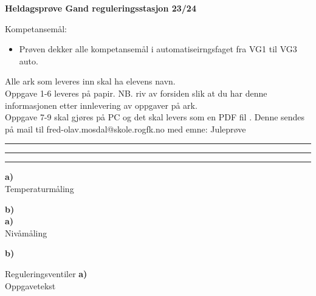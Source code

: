 
\huge
\centerline{\bf Heldagsprøve Gand reguleringsstasjon 23/24}  \bigskip
\normalsize


\vskip 3cm 
Kompetansemål:
\begin{itemize}[noitemsep]

	\item Prøven dekker alle kompetansemål i automatiseirngsfaget fra VG1 til VG3 auto.  
\end{itemize}

Alle ark som leveres inn skal ha elevens navn. \\ 

Oppgave 1-6 leveres på papir. NB. riv av forsiden slik at du har denne informasjonen etter innlevering av oppgaver på ark. \\

Oppgave 7-9 skal gjøres på PC og det skal levers som en PDF fil . Denne sendes på mail til fred-olav.mosdal@skole.rogfk.no med emne:
\vskip 5pt 
Juleprøve 

\bigskip 
\hrule
\vfil \eject
\hrule

\bigskip 
\hrule
\vfil \eject
\oppgave{}%
\textbf{a)}\\

Temperaturmåling
\vskip 1cm 


\textbf{b)}\\

\vfil \eject
\oppgave{}%
\textbf{a)}\\
Nivåmåling
\vskip 1cm 


\textbf{b)}
\vskip 1cm 

\vfil \eject
\oppgave{}%
Reguleringsventiler
\textbf{a)}\\
Oppgavetekst
\vskip 1cm 


